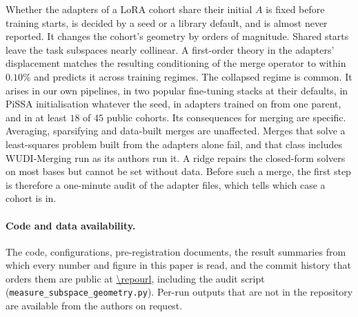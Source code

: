 Whether the adapters of a LoRA cohort share their initial $A$ is fixed before
training starts, is decided by a seed or a library default, and is almost never
reported. It changes the cohort's geometry by orders of magnitude. Shared
starts leave the task subspaces nearly collinear. A first-order theory in the
adapters' displacement matches the resulting conditioning of the merge
operator to within $0.10\%$ and predicts it across training regimes. The
collapsed regime is common. It arises in our own pipelines, in two popular
fine-tuning stacks at their defaults, in PiSSA initialisation whatever the
seed, in adapters trained on from one parent, and in at least $18$ of $45$
public cohorts. Its consequences for merging are specific. Averaging,
sparsifying and data-built merges are unaffected. Merges that solve a
least-squares problem built from the adapters alone fail, and that class
includes WUDI-Merging run as its authors run it. A ridge repairs the
closed-form solvers on most bases but cannot be set without data. Before such
a merge, the first step is therefore a one-minute audit of the adapter files,
which tells which case a cohort is in.

\paragraph{Code and data availability.} The code, configurations,
pre-registration documents, the result summaries from which every number and
figure in this paper is read, and the commit history that orders them are
public at \url{\repourl}, including the audit script
(\texttt{measure\_\allowbreak subspace\_\allowbreak geometry.py}). Per-run
outputs that are not in the repository are available from the authors on
request.
